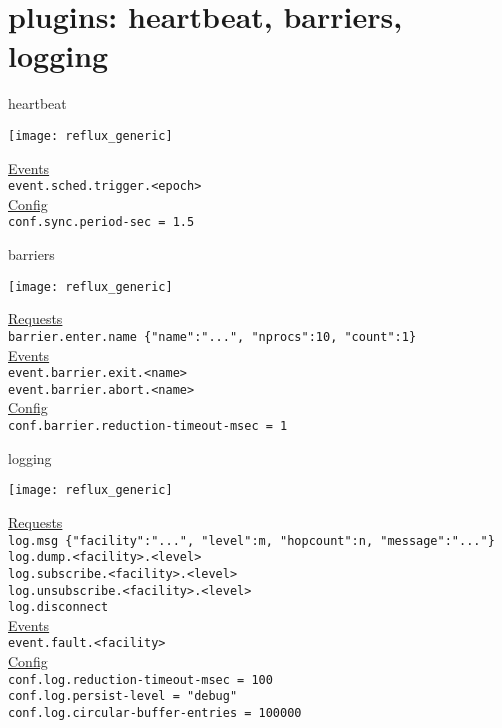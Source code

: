 \documentclass[default,pdf,colorBG,slideColor]{prosper}
\begin{document}
\part{plugins: heartbeat, barriers, logging}

\begin{slide}{heartbeat}{\tiny
\begin{center}
  \texttt{[image: reflux\_generic]}
\end{center}
\underline{Events}\\
{\tt event.sched.trigger.<epoch>}\\
\underline{Config}\\
{\tt conf.sync.period-sec = 1.5}\\
}\end{slide}

\begin{slide}{barriers}{\tiny
\begin{center}
  \texttt{[image: reflux\_generic]}
\end{center}
\underline{Requests}\\
{\tt barrier.enter.name \{"name":"...", "nprocs":10, "count":1\}}\\
\underline{Events}\\
{\tt event.barrier.exit.<name>}\\
{\tt event.barrier.abort.<name>}\\
\underline{Config}\\
{\tt conf.barrier.reduction-timeout-msec = 1}\\
}\end{slide}

\begin{slide}{logging}{\tiny
\begin{center}
  \texttt{[image: reflux\_generic]}
\end{center}
\underline{Requests}\\
{\tt log.msg \{"facility":"...", "level":m, "hopcount":n, "message":"..."\}}\\
{\tt log.dump.<facility>.<level>}\\
{\tt log.subscribe.<facility>.<level>}\\
{\tt log.unsubscribe.<facility>.<level>}\\
{\tt log.disconnect}\\
\underline{Events}\\
{\tt event.fault.<facility>}\\
\underline{Config}\\
{\tt conf.log.reduction-timeout-msec = 100}\\
{\tt conf.log.persist-level = "debug"}\\
{\tt conf.log.circular-buffer-entries = 100000}\\
}\end{slide}
\end{document}
